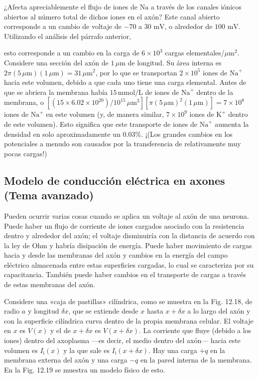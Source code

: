 \documentclass[12pt]{book}
\begin{document}
¿Afecta apreciablemente el flujo de iones de $\text{Na}$ a través de los canales iónicos abiertos al número total de dichos iones en el axón? Este canal abierto corresponde a un cambio de voltaje de $-70$ a $30\text{ mV}$, o alrededor de $100\text{ mV}$. Utilizando el análisis del párrafo anterior,

esto corresponde a un cambio en la carga de $6 \times 10^3$ cargas elementales/$\mu\text{m}^2$. Considere una sección del axón de $1\,\mu\text{m}$ de longitud. Su área interna es $2\pi(5\,\mu\text{m})(1\,\mu\text{m}) = 31\,\mu\text{m}^2$, por lo que se transportan $2 \times 10^5$ iones de $\text{Na}^+$ hacia este volumen, debido a que cada uno tiene una carga elemental. Antes de que se abriera la membrana había $15\,\text{mmol/L}$ de iones de $\text{Na}^+$ dentro de la membrana, o $[(15 \times 6.02 \times 10^{20})/10^{15}\,\mu\text{m}^3][\pi(5\,\mu\text{m})^2(1\,\mu\text{m})] = 7 \times 10^8$ iones de $\text{Na}^+$ en este volumen (y, de manera similar, $7 \times 10^9$ iones de $\text{K}^+$ dentro de este volumen). Esto significa que este transporte de iones de $\text{Na}^+$ aumenta la densidad en solo aproximadamente un $0.03\%$. ¡(Los grandes cambios en los potenciales a menudo son causados por la transferencia de relativamente muy pocas cargas!)

\subsection*{Modelo de conducción eléctrica en axones (Tema avanzado)}

Pueden ocurrir varias cosas cuando se aplica un voltaje al axón de una neurona. Puede haber un flujo de corriente de iones cargados asociado con la resistencia dentro y alrededor del axón; el voltaje disminuiría con la distancia de acuerdo con la ley de Ohm y habría disipación de energía. Puede haber movimiento de cargas hacia y desde las membranas del axón y cambios en la energía del campo eléctrico almacenada entre estas superficies cargadas, lo cual se caracteriza por su capacitancia. También puede haber cambios en el transporte de cargas a través de estas membranas del axón.

Considere una «caja de pastillas» cilíndrica, como se muestra en la Fig. 12.18, de radio $a$ y longitud $\delta x$, que se extiende desde $x$ hasta $x + \delta x$ a lo largo del axón y con la superficie cilíndrica curva dentro de la propia membrana celular. El voltaje en $x$ es $V(x)$ y el de $x + \delta x$ es $V(x + \delta x)$. La corriente que fluye (debido a los iones) dentro del axoplasma ---es decir, el medio dentro del axón--- hacia este volumen es $I_{\text{i}}(x)$ y la que sale es $I_{\text{i}}(x + \delta x)$. Hay una carga $+q$ en la membrana externa del axón y una carga $-q$ en la pared interna de la membrana. En la Fig. 12.19 se muestra un modelo físico de esto.
\end{document}
